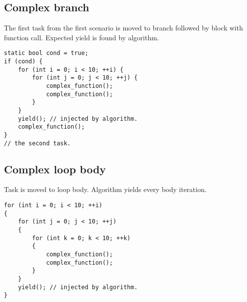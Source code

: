 \subsection{Complex branch}
The first task from the first scenario is moved to branch followed by block with function call. Expected yield is found by algorithm.

\begin{lstlisting}[caption={The second scenario with complex branch.}]
static bool cond = true;
if (cond) {
    for (int i = 0; i < 10; ++i) {
        for (int j = 0; j < 10; ++j) {
            complex_function();
            complex_function();
        }
    }
    yield(); // injected by algorithm.
    complex_function();
}
// the second task.
\end{lstlisting}

\subsection{Complex loop body}
Task is moved to loop body. Algorithm yields every body iteration.

\begin{lstlisting}[caption={The third scenario with complex loop body.}]
for (int i = 0; i < 10; ++i)
{
    for (int j = 0; j < 10; ++j)
    {
        for (int k = 0; k < 10; ++k)
        {
            complex_function();
            complex_function();
        }
    }
    yield(); // injected by algorithm.
}
\end{lstlisting}